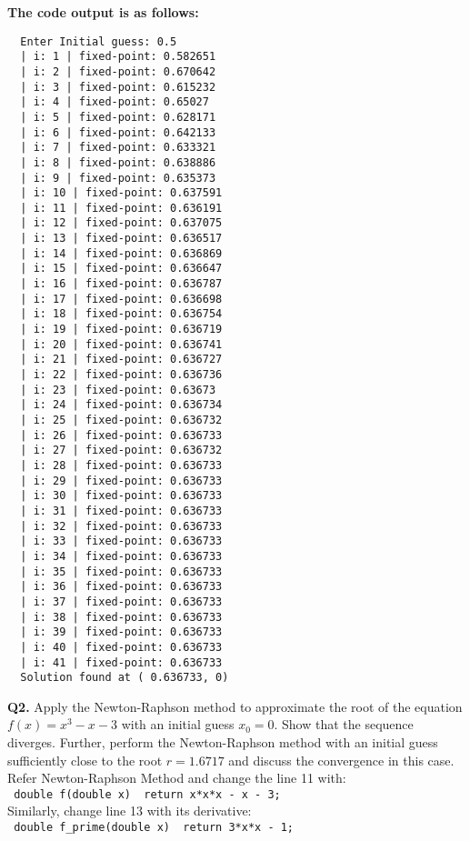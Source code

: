 \documentclass[a4paper]{article}
\begin{document}
\begin{answer}{}
	\inputminted[linenos]{cpp}{/home/solomazer/devel/solvers/fixed-point-iteration.cpp}
\end{answer}
\textbf{The code output is as follows:}
\begin{verbatim}
  Enter Initial guess: 0.5
  | i: 1 | fixed-point: 0.582651
  | i: 2 | fixed-point: 0.670642
  | i: 3 | fixed-point: 0.615232
  | i: 4 | fixed-point: 0.65027
  | i: 5 | fixed-point: 0.628171
  | i: 6 | fixed-point: 0.642133
  | i: 7 | fixed-point: 0.633321
  | i: 8 | fixed-point: 0.638886
  | i: 9 | fixed-point: 0.635373
  | i: 10 | fixed-point: 0.637591
  | i: 11 | fixed-point: 0.636191
  | i: 12 | fixed-point: 0.637075
  | i: 13 | fixed-point: 0.636517
  | i: 14 | fixed-point: 0.636869
  | i: 15 | fixed-point: 0.636647
  | i: 16 | fixed-point: 0.636787
  | i: 17 | fixed-point: 0.636698
  | i: 18 | fixed-point: 0.636754
  | i: 19 | fixed-point: 0.636719
  | i: 20 | fixed-point: 0.636741
  | i: 21 | fixed-point: 0.636727
  | i: 22 | fixed-point: 0.636736
  | i: 23 | fixed-point: 0.63673
  | i: 24 | fixed-point: 0.636734
  | i: 25 | fixed-point: 0.636732
  | i: 26 | fixed-point: 0.636733
  | i: 27 | fixed-point: 0.636732
  | i: 28 | fixed-point: 0.636733
  | i: 29 | fixed-point: 0.636733
  | i: 30 | fixed-point: 0.636733
  | i: 31 | fixed-point: 0.636733
  | i: 32 | fixed-point: 0.636733
  | i: 33 | fixed-point: 0.636733
  | i: 34 | fixed-point: 0.636733
  | i: 35 | fixed-point: 0.636733
  | i: 36 | fixed-point: 0.636733
  | i: 37 | fixed-point: 0.636733
  | i: 38 | fixed-point: 0.636733
  | i: 39 | fixed-point: 0.636733
  | i: 40 | fixed-point: 0.636733
  | i: 41 | fixed-point: 0.636733
  Solution found at ( 0.636733, 0)
\end{verbatim}

\textbf{Q2.}
Apply the Newton-Raphson method to approximate the root of the equation $f(x) = x^3 - x - 3$
with an initial guess $x_0 = 0$. Show that the sequence diverges. Further, perform the
Newton-Raphson method with an initial guess sufficiently close to the root $r = 1.6717$ and
discuss the convergence in this case.\\

Refer Newton-Raphson Method and change the line 11 with: \\
\texttt{ double f(double x) { return x*x*x - x - 3; }} \\
Similarly, change line 13 with its derivative: \\
\texttt{ double f_prime(double x) { return 3*x*x - 1; } }\\
\end{document}
